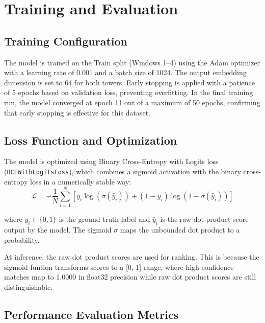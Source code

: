 \section{Training and Evaluation}
\label{sec:user_training}

\subsection{Training Configuration}
\label{sec:training_config}

The model is trained on the Train split (Windows 1--4) using the Adam optimizer with a learning rate of 0.001 and a batch size of 1024. The output embedding dimension is set to 64 for both towers. Early stopping is applied with a patience of 5 epochs based on validation loss, preventing overfitting. In the final training run, the model converged at epoch 11 out of a maximum of 50 epochs, confirming that early stopping is effective for this dataset.

\subsection{Loss Function and Optimization}
\label{sec:loss_function}

The model is optimized using Binary Cross-Entropy with Logits loss (\texttt{BCEWithLogitsLoss}), which combines a sigmoid activation with the binary cross-entropy loss in a numerically stable way:
\begin{equation}
\mathcal{L} = -\frac{1}{N} \sum_{i=1}^{N} \left[ y_i \log(\sigma(\hat{y}_i)) + (1 - y_i) \log(1 - \sigma(\hat{y}_i)) \right]
\end{equation}

where $y_i \in \{0, 1\}$ is the ground truth label and $\hat{y}_i$ is the raw dot product score output by the model. The sigmoid $\sigma$ maps the unbounded dot product to a probability. 

At inference, the raw dot product scores are used for ranking. This is because the sigmoid funtion transforms scores to a [0, 1] range, where high-confidence matches map to 1.0000 in float32 precision while raw dot product scores are still distinguishable. 
\subsection{Performance Evaluation Metrics}
\label{sec:eval_metrics}

